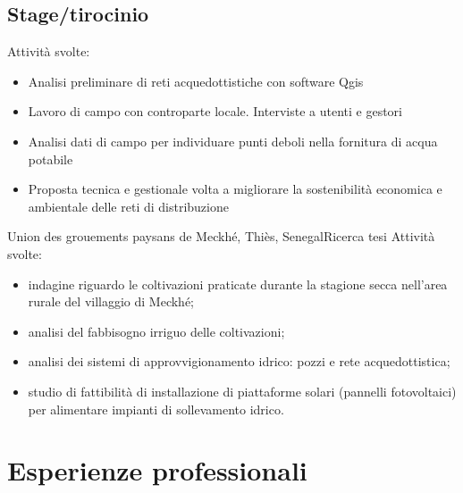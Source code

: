 \documentclass[12pt,a4paper,sans]{moderncv} %
\begin{document}
\subsection{Stage/tirocinio}
Attività svolte:
\begin{itemize}
\item Analisi preliminare di reti acquedottistiche con software Qgis
\item Lavoro di campo con controparte locale. Interviste a utenti e gestori
\item Analisi dati di campo per individuare punti deboli nella fornitura di acqua potabile
\item Proposta tecnica e gestionale volta a migliorare la sostenibilità economica e ambientale delle reti di distribuzione
\end{itemize}
\medskip
{} {Union des grouements paysans de Meckhé, Thiès, Senegal}{Ricerca tesi}{}{}{}
Attività svolte:
\begin{itemize}
\item indagine riguardo le coltivazioni praticate durante la stagione secca nell'area rurale del villaggio di Meckhé;
\item analisi del fabbisogno irriguo delle coltivazioni;
\item analisi dei sistemi di approvvigionamento idrico: pozzi e rete acquedottistica;
\item studio di fattibilità di installazione di piattaforme solari (pannelli fotovoltaici) per alimentare impianti di sollevamento idrico.
\end{itemize}
%
%


\section{Esperienze professionali}
\end{document}
